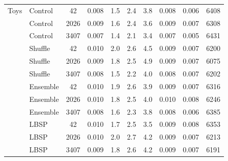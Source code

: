 \begin{longtable}{@{}llS[table-format=4.0]S[table-format=1.3]S[table-format=2.1]S[table-format=2.1]S[table-format=2.1]S[table-format=1.3]S[table-format=1.3]S[table-format=5.0]@{}}
\midrule
Toys & Control & 42 & 0.008 & 1.5 & 2.4 & 3.8 & 0.008 & 0.006 & 6408\\ %
 & Control & 2026 & 0.009 & 1.6 & 2.4 & 3.6 & 0.009 & 0.007 & 6308\\ %
 & Control & 3407 & 0.007 & 1.4 & 2.1 & 3.4 & 0.007 & 0.005 & 6431\\ %
 & Shuffle & 42 & 0.010 & 2.0 & 2.6 & 4.5 & 0.009 & 0.007 & 6200\\ %
 & Shuffle & 2026 & 0.009 & 1.8 & 2.5 & 4.9 & 0.009 & 0.007 & 6075\\ %
 & Shuffle & 3407 & 0.008 & 1.5 & 2.2 & 4.0 & 0.008 & 0.007 & 6202\\ %
 & Ensemble & 42 & 0.010 & 1.9 & 2.6 & 3.9 & 0.009 & 0.007 & 6316\\ %
 & Ensemble & 2026 & 0.010 & 1.8 & 2.5 & 4.0 & 0.010 & 0.008 & 6246\\ %
 & Ensemble & 3407 & 0.008 & 1.6 & 2.3 & 3.8 & 0.008 & 0.006 & 6385\\ %
 & LBSP & 42 & 0.010 & 1.7 & 2.5 & 3.5 & 0.009 & 0.008 & 6353\\ %
 & LBSP & 2026 & 0.010 & 2.0 & 2.7 & 4.2 & 0.009 & 0.007 & 6213\\ %
 & LBSP & 3407 & 0.009 & 1.8 & 2.6 & 4.2 & 0.009 & 0.007 & 6191\\ %
\end{longtable}
\endgroup
